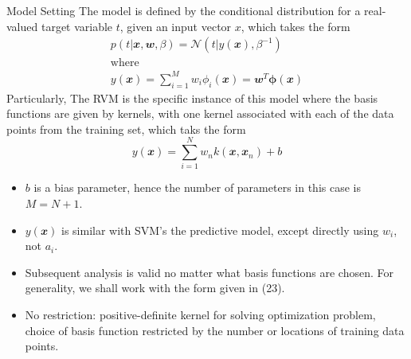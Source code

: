 \documentclass{bredelebeamer}
\begin{document}
\begin{frame}{Model Setting}
  The model is defined by the conditional distribution for a real-valued target
  variable $t$, given an input vector $x$, which takes the form
  \begin{equation}
    \begin{gathered}
      p(t|\mathbfit{x}, \mathbfit{w}, \beta) = \mathcal{N}(t|y(\mathbfit{x}), \beta^{-1}) \\
      \textrm{where} \\
      y(\mathbfit{x}) = \sum_{i=1}^{M} w_i \phi_i (\mathbfit{x}) = \mathbfit{w}^T \boldsymbol{\phi}(\mathbfit{x})
     \end{gathered}
  \end{equation}
  Particularly, The RVM is the specific instance of this model where the basis
  functions are given by kernels, with one kernel associated with each of the
  data points from the training set, which taks the form
  \begin{equation}
    y(\mathbfit{x}) = \sum_{i=1}^{N} w_n k(\mathbfit{x}, \mathbfit{x}_n) + b
  \end{equation}
  \begin{itemize}
    \item $b$ is a bias parameter, hence the number of parameters in this case is $M = N + 1$.
    \item $y(\mathbfit{x})$ is similar with SVM's the predictive model,
          except directly using $w_i$, not $a_i$.
    \item Subsequent analysis is valid no matter what basis functions are chosen.
          For generality, we shall work with the form given in (23).
    \item No restriction: positive-definite kernel for solving optimization problem,
          choice of basis function restricted by the number or locations of training data points.
  \end{itemize}
\end{frame}
\end{document}
